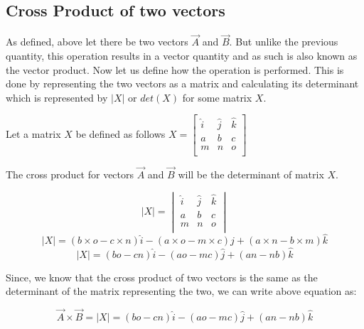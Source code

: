 \documentclass[12pt, a4paper]{article}
\begin{document}
	\subsection{Cross Product of two vectors}
	As defined, above let there be two vectors $\overrightarrow{A}$ and 
	$\overrightarrow{B}$. But unlike the previous quantity, this operation
	results in a vector quantity and as such is also known as the vector
	product.
	Now let us define how the operation is performed. This is done by 
	representing the two vectors as a matrix and calculating its determinant
	which is represented by $|X|$ or $det(X)$ for some matrix $X$.
	
	Let a matrix $X$ be defined as follows
	$X = \begin{bmatrix}
		 \hat{i} & \hat{j} & \hat{k}\\
		 a		 & b	   & c		\\
		 m		 & n	   & o		\\
	 	 \end{bmatrix}$
 	 
 	The cross product for vectors $\overrightarrow{A}$ and $\overrightarrow{B}$
 	will be the determinant of matrix $X$.
 	
 	\begin{displaymath}
 		|X| = \begin{vmatrix}
 		\hat{i} & \hat{j} & \hat{k}\\
 		a		 & b	   & c		\\
 		m		 & n	   & o		\\	
 		\end{vmatrix}
 	\end{displaymath}
 	\begin{displaymath}
 		|X| = (b \times o - c \times n)\hat{i} - (a \times o - m \times c)\hat{j}
 		+ (a \times n - b \times m)\hat{k}
 	\end{displaymath}
 	 \begin{displaymath}
 	 	|X| = (bo - cn)\hat{i} - (ao - mc)\hat{j} + (an - nb)\hat{k}
 	 \end{displaymath}
	
	Since, we know that the cross product of two vectors is the same as the 
	determinant of the matrix representing the two, we can write above equation as:
	
	\begin{displaymath}
		\overrightarrow{A} \times \overrightarrow{B} = |X| = 
			(bo - cn)\hat{i} - (ao - mc)\hat{j} + (an - nb)\hat{k}
	\end{displaymath}
\end{document}
